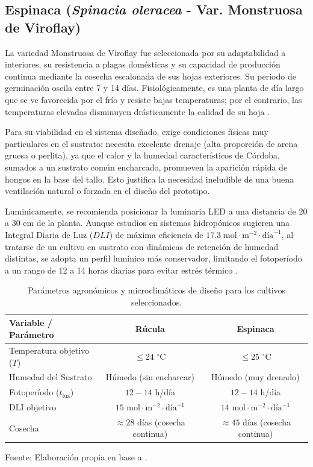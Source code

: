 \subsection{Espinaca (\textit{Spinacia oleracea} - Var. Monstruosa de Viroflay)}
La variedad Monstruosa de Viroflay fue seleccionada por su adaptabilidad a interiores, su resistencia a plagas domésticas y su capacidad de producción continua mediante la cosecha escalonada de sus hojas exteriores. Su periodo de germinación oscila entre 7 y 14 días. Fisiológicamente, es una planta de día largo que se ve favorecida por el frío y resiste bajas temperaturas; por el contrario, las temperaturas elevadas disminuyen drásticamente la calidad de su hoja \cite{mapa_espinaca}.

Para su viabilidad en el sistema diseñado, exige condiciones físicas muy particulares en el sustrato: necesita excelente drenaje (alta proporción de arena gruesa o perlita), ya que el calor y la humedad característicos de Córdoba, sumados a un sustrato común encharcado, promueven la aparición rápida de hongos en la base del tallo. Esto justifica la necesidad ineludible de una buena ventilación natural o forzada en el diseño del prototipo.

Luminicamente, se recomienda posicionar la luminaria LED a una distancia de 20 a 30 cm de la planta. Aunque estudios en sistemas hidropónicos sugieren una Integral Diaria de Luz ($DLI$) de máxima eficiencia de $17.3 \;\text{mol}\cdot\text{m}^{-2}\cdot\text{día}^{-1}$, al tratarse de un cultivo en sustrato con dinámicas de retención de humedad distintas, se adopta un perfil lumínico más conservador, limitando el fotoperíodo a un rango de 12 a 14 horas diarias para evitar estrés térmico \cite{espinaca_dli_ouci, espinaca_mdpi}.

\begin{table}[h!]
\centering
\small
\begin{tabular}{lcc}
\hline
\textbf{Variable / Parámetro} & \textbf{Rúcula} & \textbf{Espinaca} \\ \hline
Temperatura objetivo ($T$) & $\le 24$ $^\circ$C & $\le 25$ $^\circ$C \\
Humedad del Sustrato & Húmedo (sin encharcar) & Húmedo (muy drenado) \\
Fotoperíodo ($t_{\text{luz}}$) & $12 - 14$ h/día & $12 - 14$ h/día \\
DLI objetivo & $15$ $\text{mol}\cdot\text{m}^{-2}\cdot\text{día}^{-1}$ & $14$ $\text{mol}\cdot\text{m}^{-2}\cdot\text{día}^{-1}$ \\
Cosecha & $\approx 28$ días (cosecha continua) & $\approx 45$ días (cosecha continua) \\ \hline
\end{tabular}

\caption{Parámetros agronómicos y microclimáticos de diseño para los cultivos seleccionados.}
\label{tab:parametros_cultivos}

\vspace{2mm}
{\small Fuente: Elaboración propia en base a \cite{rucula_mdpi, espinaca_dli_ouci, mapa_espinaca, espinaca_mdpi}.}

\end{table}

